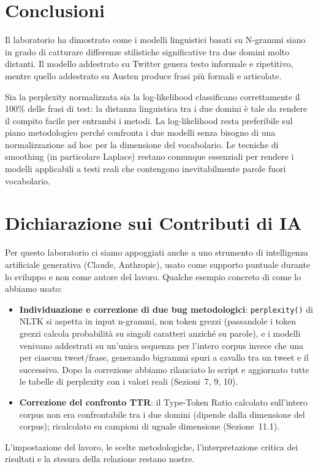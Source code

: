 ﻿\documentclass[12pt,a4paper]{article}
\begin{document}
\section{Conclusioni}

Il laboratorio ha dimostrato come i modelli linguistici basati su N-grammi siano in grado di catturare differenze stilistiche significative tra due domini molto distanti. Il modello addestrato su Twitter genera testo informale e ripetitivo, mentre quello addestrato su Austen produce frasi più formali e articolate.

Sia la perplexity normalizzata sia la log-likelihood classificano correttamente il 100\% delle frasi di test: la distanza linguistica tra i due domini è tale da rendere il compito facile per entrambi i metodi. La log-likelihood resta preferibile sul piano metodologico perché confronta i due modelli senza bisogno di una normalizzazione ad hoc per la dimensione del vocabolario. Le tecniche di smoothing (in particolare Laplace) restano comunque essenziali per rendere i modelli applicabili a testi reali che contengono inevitabilmente parole fuori vocabolario.

\section{Dichiarazione sui Contributi di IA}

Per questo laboratorio ci siamo appoggiati anche a uno strumento di intelligenza artificiale generativa (Claude, Anthropic), usato come supporto puntuale durante lo sviluppo e non come autore del lavoro. Qualche esempio concreto di come lo abbiamo usato:

\begin{itemize}
  \item \textbf{Individuazione e correzione di due bug metodologici}: \texttt{perplexity()} di NLTK si aspetta in input n-grammi, non token grezzi (passandole i token grezzi calcola probabilità su singoli caratteri anziché su parole), e i modelli venivano addestrati su un'unica sequenza per l'intero corpus invece che una per ciascun tweet/frase, generando bigrammi spuri a cavallo tra un tweet e il successivo. Dopo la correzione abbiamo rilanciato lo script e aggiornato tutte le tabelle di perplexity con i valori reali (Sezioni~7, 9, 10).
  \item \textbf{Correzione del confronto TTR}: il Type-Token Ratio calcolato sull'intero corpus non era confrontabile tra i due domini (dipende dalla dimensione del corpus); ricalcolato su campioni di uguale dimensione (Sezione~11.1).
\end{itemize}

L'impostazione del lavoro, le scelte metodologiche, l'interpretazione critica dei risultati e la stesura della relazione restano nostre.
\end{document}
